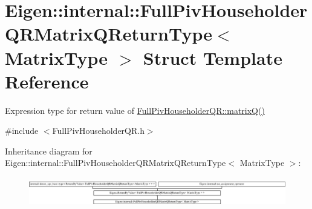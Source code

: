 \hypertarget{struct_eigen_1_1internal_1_1_full_piv_householder_q_r_matrix_q_return_type}{}\section{Eigen\+::internal\+::Full\+Piv\+Householder\+Q\+R\+Matrix\+Q\+Return\+Type$<$ Matrix\+Type $>$ Struct Template Reference}
\label{struct_eigen_1_1internal_1_1_full_piv_householder_q_r_matrix_q_return_type}


Expression type for return value of \mbox{\hyperlink{class_eigen_1_1_full_piv_householder_q_r_ad26dd2d3c002939771d2375e4e051c28}{Full\+Piv\+Householder\+Q\+R\+::matrix\+Q()}}  




{\ttfamily \#include $<$Full\+Piv\+Householder\+Q\+R.\+h$>$}

Inheritance diagram for Eigen\+::internal\+::Full\+Piv\+Householder\+Q\+R\+Matrix\+Q\+Return\+Type$<$ Matrix\+Type $>$\+:\begin{figure}[H]
\begin{center}
\leavevmode
\includegraphics[height=1.292308cm]{struct_eigen_1_1internal_1_1_full_piv_householder_q_r_matrix_q_return_type}
\end{center}
\end{figure}

